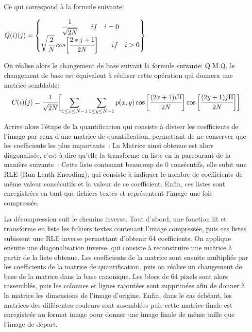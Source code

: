 \documentclass[12pt]{article}
\begin{document}
\paragraph{}

Ce qui correspond à la formule suivante:
\begin{center}
$Q(i)(j)=
\begin{Bmatrix}
\cfrac{1}{\sqrt{2N}}  \qquad if \quad i=0 \\
\sqrt{\cfrac{2}{N}} \: cos\biggl[\cfrac{2*j+1}{2N}\biggr] \qquad if \quad i>0 \\
\end{Bmatrix}
$
\end{center}
On réalise alors le changement de base suivant la formule suivante: Q.M.Q, le changement de base est équivalent à réaliser cette opération qui donnera une matrice semblable:
\begin{equation*} 
C(i)(j)=\cfrac{1}{\sqrt{2N}} \biggl[\sum_{1\leq x\leq N-1} \sum_{1\leq y\leq N-1} p(x,y) \cos{\biggl[\cfrac{(2x+1) i \Pi}{2N}}\biggr] \cos{\biggl[\cfrac{(2y+1) j \Pi}{2N}}\biggr]\biggr]
\end{equation*}


 Arrive alors l’étape de la quantification qui consiste à diviser les coefficients de l’image par ceux d’une matrice de quantification, permettant de ne conserver que les coefficients les plus importants : 
La Matrice ainsi obtenue est alors diagonalisée, c’est-à-dire qu’elle la transforme en liste en la parcourant de la manière suivante :
Cette liste contenant beaucoup de 0 consécutifs, elle subit une RLE (Run-Lenth Encoding), qui consiste à indiquer le nombre de coefficients de même valeur consécutifs et la valeur de ce coefficient. Enfin, ces listes sont enregistrées en tant que fichiers textes et représentent l’image une fois compressée.

La décompression suit le chemins inverse. Tout d’abord, une fonction lit et transforme en liste les fichiers textes contenant l’image compressée, puis ces listes subissent une RLE inverse permettant d’obtenir 64 coefficients. On applique ensuite une diagonalisation inverse, qui consiste à reconstruire une matrice à partir de la liste obtenue. Les coefficients de la matrice sont ensuite multipliés par les coefficients de la matrice de quantification, puis on réalise un changement de base de la matrice dans la base canonique. Les blocs de 64 pixels sont alors rassemblés, puis les colonnes et lignes rajoutées sont supprimées afin de donner à la matrice les dimensions de l’image d’origine. Enfin, dans le cas échéant, les matrices des différentes couleurs sont assemblées puis cette matrice finale est enregistrée au format image pour donner une image finale de même taille que l’image de départ.
\end{document}
